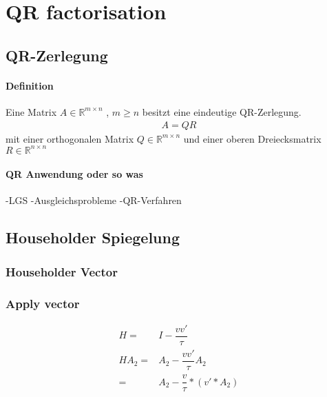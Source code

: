\chapter{QR factorisation}

\section{QR-Zerlegung}
\subsubsection{Definition}
Eine Matrix $A \in \mathbb{R}^{m \times n}$ , $m \ge n$ besitzt eine eindeutige QR-Zerlegung.
\begin{align}
	A = QR
\end{align}
mit einer orthogonalen Matrix $ Q \in \mathbb{R}^{m \times n} $ und einer oberen Dreiecksmatrix $ R \in \mathbb{R}^{n \times n}$ 


\subsubsection{QR Anwendung oder so was}
-LGS 
-Ausgleichsprobleme 
-QR-Verfahren 

\section{Householder Spiegelung}
\subsection{Householder Vector}
\subsection{Apply vector}
\begin{align}
H =& I - \dfrac{vv'}{\tau}\\ 
H A_2 =& A_2 - \dfrac{vv'}{\tau}A_2\\
=& A_2 - \dfrac{v}{\tau}*(v'*A_2)
\end{align}


